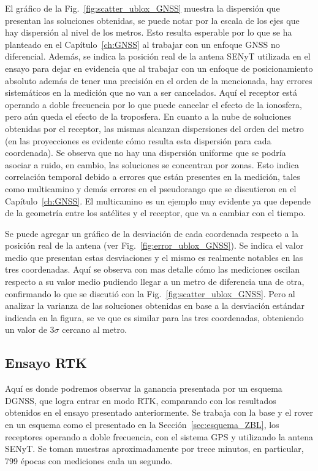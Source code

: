 \documentclass[a4paper,12pt,oneside,onecolumn,final,openright]{book}%
\begin{document}
	El gráfico de la Fig.~\ref{fig:scatter_ublox_GNSS} muestra la dispersión que presentan las soluciones obtenidas, se puede notar por la escala de los ejes que hay dispersión al nivel de los metros. Esto resulta esperable por lo que se ha planteado en el Capítulo~\ref{ch:GNSS} al trabajar con un enfoque GNSS no diferencial. Además, se indica la posición real de la antena SENyT utilizada en el ensayo para dejar en evidencia que al trabajar con un enfoque de posicionamiento absoluto además de tener una precisión en el orden de la mencionada, hay errores sistemáticos en la medición que no van a ser cancelados. Aquí el receptor está operando a doble frecuencia por lo que puede cancelar el efecto de la ionosfera, pero aún queda el efecto de la troposfera. En cuanto a la nube de soluciones obtenidas por el receptor, las mismas alcanzan dispersiones del orden del metro (en las proyecciones es evidente cómo resulta esta dispersión para cada coordenada). Se observa que no hay una dispersión uniforme que se podría asociar a ruido, en cambio, las soluciones se concentran por zonas. Esto indica correlación temporal debido a errores que están presentes en la medición, tales como multicamino y demás errores en el pseudorango que se discutieron en el Capítulo~\ref{ch:GNSS}. El multicamino es un ejemplo muy evidente ya que depende de la geometría entre los satélites y el receptor, que va a cambiar con el tiempo.
	
	 Se puede agregar un gráfico de la desviación de cada coordenada respecto a la posición real de la antena (ver Fig.~\ref{fig:error_ublox_GNSS}). Se indica el valor medio que presentan estas desviaciones y el mismo es realmente notables en las tres coordenadas. Aquí se observa con mas detalle cómo las mediciones oscilan respecto a su valor medio pudiendo llegar a un metro de diferencia una de otra, confirmando lo que se discutió con la Fig.~\ref{fig:scatter_ublox_GNSS}. Pero al analizar la varianza de las soluciones obtenidas en base a la desviación estándar indicada en la figura, se ve que es similar para las tres coordenadas, obteniendo un valor de $3\sigma$ cercano al metro. 

\subsection{Ensayo RTK}\label{sec:RTK_ublox}
	Aquí es donde podremos observar la ganancia presentada por un esquema DGNSS, que logra entrar en modo RTK, comparando con los resultados obtenidos en el ensayo presentado anteriormente. Se trabaja con la base y el rover en un esquema como el presentado en la Sección~\ref{sec:esquema_ZBL}, los receptores operando a doble frecuencia, con el sistema GPS y utilizando la antena SENyT. Se toman muestras aproximadamente por trece minutos, en particular, 799 épocas con mediciones cada un segundo. 
	
\end{document}
